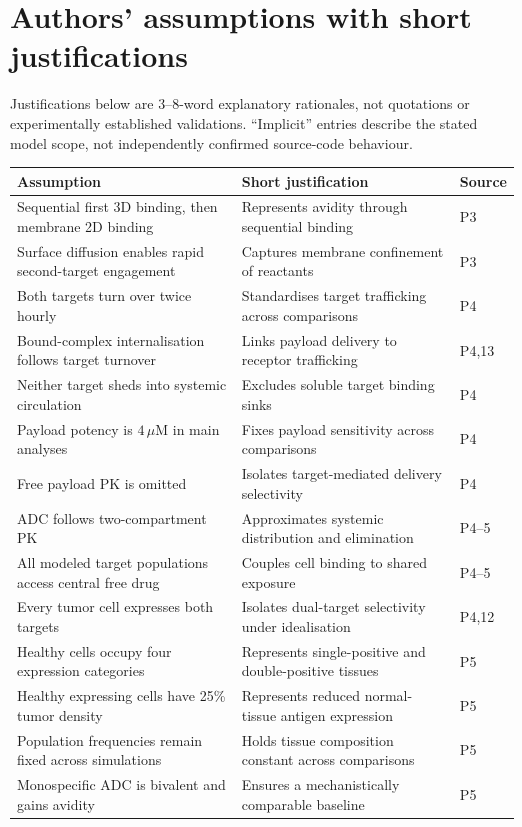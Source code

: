\documentclass[11pt,a4paper]{article}
\begin{document}
\section{Authors' assumptions with short justifications}
Justifications below are 3--8-word explanatory rationales, not quotations or experimentally established validations. ``Implicit'' entries describe the stated model scope, not independently confirmed source-code behaviour.
\begin{longtable}{p{.57\linewidth}p{.29\linewidth}p{.08\linewidth}}
\toprule Assumption & Short justification & Source\\\midrule\endhead
Sequential first 3D binding, then membrane 2D binding & Represents avidity through sequential binding & P3\\
Surface diffusion enables rapid second-target engagement & Captures membrane confinement of reactants & P3\\
Both targets turn over twice hourly & Standardises target trafficking across comparisons & P4\\
Bound-complex internalisation follows target turnover & Links payload delivery to receptor trafficking & P4,13\\
Neither target sheds into systemic circulation & Excludes soluble target binding sinks & P4\\
Payload potency is $4\,\mu$M in main analyses & Fixes payload sensitivity across comparisons & P4\\
Free payload PK is omitted & Isolates target-mediated delivery selectivity & P4\\
ADC follows two-compartment PK & Approximates systemic distribution and elimination & P4--5\\
All modeled target populations access central free drug & Couples cell binding to shared exposure & P4--5\\
Every tumor cell expresses both targets & Isolates dual-target selectivity under idealisation & P4,12\\
Healthy cells occupy four expression categories & Represents single-positive and double-positive tissues & P5\\
Healthy expressing cells have 25\% tumor density & Represents reduced normal-tissue antigen expression & P5\\
Population frequencies remain fixed across simulations & Holds tissue composition constant across comparisons & P5\\
Monospecific ADC is bivalent and gains avidity & Ensures a mechanistically comparable baseline & P5\\

\end{longtable}
\end{document}
